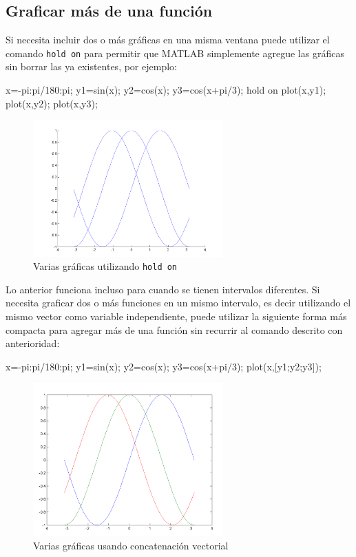 \subsection{Graficar más de una función}

Si necesita incluir dos o más gráficas en una misma ventana puede
utilizar el comando \texttt{hold\ on} para permitir que MATLAB
simplemente agregue las gráficas sin borrar las ya existentes, por
ejemplo:

\begin{matlab}
x=-pi:pi/180:pi;
y1=sin(x);
y2=cos(x);
y3=cos(x+pi/3);
hold on
plot(x,y1);
plot(x,y2);
plot(x,y3);
\end{matlab}

\begin{figure}[htbp]
    \centering
    \includegraphics[width=0.65\textwidth]{images/ch4/img_4_2.png}
    \caption{Varias gráficas utilizando \texttt{hold on}}
    \label{fig:img_4_2}
\end{figure}

Lo anterior funciona incluso para cuando se tienen intervalos
diferentes. Si necesita graficar dos o más funciones en un mismo
intervalo, es decir utilizando el mismo vector como variable
independiente, puede utilizar la siguiente forma más compacta para
agregar más de una función sin recurrir al comando descrito con
anterioridad:

\begin{matlab}
x=-pi:pi/180:pi;
y1=sin(x);
y2=cos(x);
y3=cos(x+pi/3);
plot(x,[y1;y2;y3]);
\end{matlab}

\begin{figure}[htbp]
    \centering
    \includegraphics[width=0.65\textwidth]{images/ch4/img_4_3.png}
    \caption{Varias gráficas usando concatenación vectorial}
    \label{fig:img_4_3}
\end{figure}

